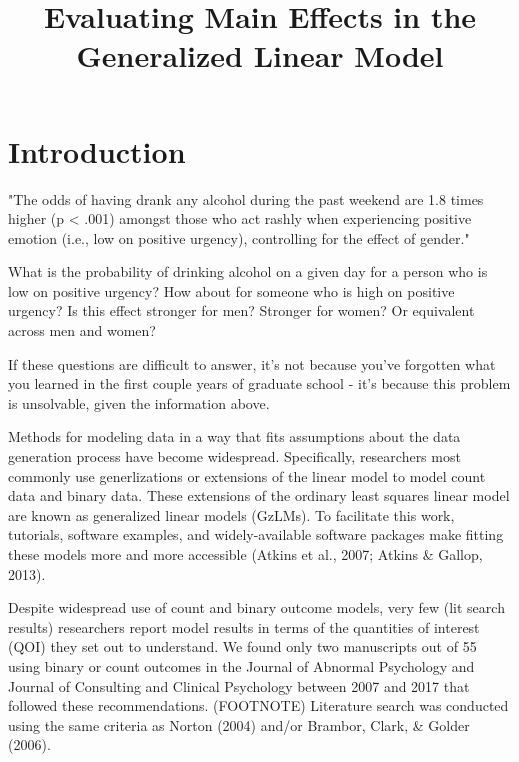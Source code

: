 \documentclass[jou, apacite]{apa6}
\begin{document}
\title{Evaluating Main Effects in the Generalized Linear Model}


\abstract{}



\maketitle

\section{Introduction}
"The odds of having drank any alcohol during the past weekend are 1.8 times higher (p < .001) amongst those who act rashly when experiencing positive emotion (i.e., low on positive urgency), controlling for the effect of gender."

What is the probability of drinking alcohol on a given day for a person who is low on positive urgency? How about for someone who is high on positive urgency? Is this effect stronger for men? Stronger for women? Or equivalent across men and women?

If these questions are difficult to answer, it's not because you've forgotten what you learned in the first couple years of graduate school - it's because this problem is unsolvable, given the information above. 

Methods for modeling data in a way that fits assumptions about the data generation process have become widespread.
Specifically, researchers most commonly use generlizations or extensions of the linear model to model count data and binary data.
These extensions of the ordinary least squares linear model are known as generalized linear models (GzLMs).
To facilitate this work, tutorials, software examples, and widely-available software packages make fitting these models more and more accessible (Atkins et al., 2007; Atkins \& Gallop, 2013).

Despite widespread use of count and binary outcome models, very few (lit search results) researchers report model results in terms of the quantities of interest (QOI) they set out to understand. 
We found only two manuscripts out of 55 using binary or count outcomes in the Journal of Abnormal Psychology and Journal of Consulting and Clinical Psychology between 2007 and 2017 that followed these recommendations. (FOOTNOTE) 
Literature search was conducted using the same criteria as Norton (2004) and/or Brambor, Clark, \& Golder (2006). 
\end{document}
